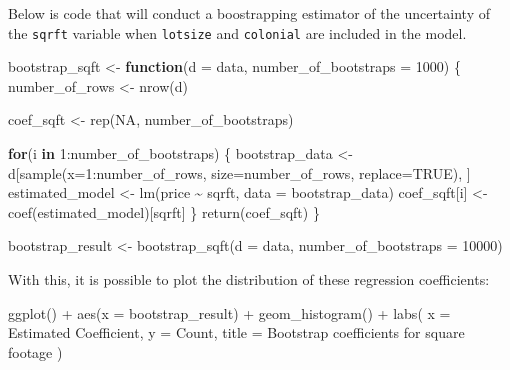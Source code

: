 \documentclass[
]{book}
\newenvironment{Shaded}{\begin{snugshade}}{\end{snugshade}}
\newcommand{\AttributeTok}[1]{\textcolor[rgb]{0.77,0.63,0.00}{#1}}
\newcommand{\ConstantTok}[1]{\textcolor[rgb]{0.00,0.00,0.00}{#1}}
\newcommand{\ControlFlowTok}[1]{\textcolor[rgb]{0.13,0.29,0.53}{\textbf{#1}}}
\newcommand{\DecValTok}[1]{\textcolor[rgb]{0.00,0.00,0.81}{#1}}
\newcommand{\FunctionTok}[1]{\textcolor[rgb]{0.00,0.00,0.00}{#1}}
\newcommand{\NormalTok}[1]{#1}
\newcommand{\OtherTok}[1]{\textcolor[rgb]{0.56,0.35,0.01}{#1}}
\newcommand{\SpecialCharTok}[1]{\textcolor[rgb]{0.00,0.00,0.00}{#1}}
\newcommand{\StringTok}[1]{\textcolor[rgb]{0.31,0.60,0.02}{#1}}
\theoremstyle{definition}
\theoremstyle{definition}
\theoremstyle{definition}
\theoremstyle{definition}
\theoremstyle{remark}
\begin{document}
Below is code that will conduct a boostrapping estimator of the uncertainty of the \texttt{sqrft} variable when \texttt{lotsize} and \texttt{colonial} are included in the model.

\begin{Shaded}
\begin{Highlighting}[]
\NormalTok{bootstrap\_sqft }\OtherTok{\textless{}{-}} \ControlFlowTok{function}\NormalTok{(}\AttributeTok{d =}\NormalTok{ data, }\AttributeTok{number\_of\_bootstraps =} \DecValTok{1000}\NormalTok{) \{ }
\NormalTok{  number\_of\_rows }\OtherTok{\textless{}{-}} \FunctionTok{nrow}\NormalTok{(d)}

\NormalTok{    coef\_sqft }\OtherTok{\textless{}{-}} \FunctionTok{rep}\NormalTok{(}\ConstantTok{NA}\NormalTok{, number\_of\_bootstraps)}

    \ControlFlowTok{for}\NormalTok{(i }\ControlFlowTok{in} \DecValTok{1}\SpecialCharTok{:}\NormalTok{number\_of\_bootstraps) \{ }
\NormalTok{      bootstrap\_data }\OtherTok{\textless{}{-}}\NormalTok{ d[}\FunctionTok{sample}\NormalTok{(}\AttributeTok{x=}\DecValTok{1}\SpecialCharTok{:}\NormalTok{number\_of\_rows, }\AttributeTok{size=}\NormalTok{number\_of\_rows, }\AttributeTok{replace=}\ConstantTok{TRUE}\NormalTok{), ]  }
\NormalTok{      estimated\_model }\OtherTok{\textless{}{-}} \FunctionTok{lm}\NormalTok{(price }\SpecialCharTok{\textasciitilde{}}\NormalTok{ sqrft, }\AttributeTok{data =}\NormalTok{ bootstrap\_data)}
\NormalTok{      coef\_sqft[i]    }\OtherTok{\textless{}{-}} \FunctionTok{coef}\NormalTok{(estimated\_model)[}\StringTok{\textquotesingle{}sqrft\textquotesingle{}}\NormalTok{]}
\NormalTok{    \}}
  \FunctionTok{return}\NormalTok{(coef\_sqft)}
\NormalTok{\}}
\end{Highlighting}
\end{Shaded}

\begin{Shaded}
\begin{Highlighting}[]
\NormalTok{bootstrap\_result }\OtherTok{\textless{}{-}} \FunctionTok{bootstrap\_sqft}\NormalTok{(}\AttributeTok{d =}\NormalTok{ data, }\AttributeTok{number\_of\_bootstraps =} \DecValTok{10000}\NormalTok{)}
\end{Highlighting}
\end{Shaded}

With this, it is possible to plot the distribution of these regression coefficients:

\begin{Shaded}
\begin{Highlighting}[]
\FunctionTok{ggplot}\NormalTok{() }\SpecialCharTok{+} 
  \FunctionTok{aes}\NormalTok{(}\AttributeTok{x =}\NormalTok{ bootstrap\_result) }\SpecialCharTok{+} 
  \FunctionTok{geom\_histogram}\NormalTok{() }\SpecialCharTok{+} 
  \FunctionTok{labs}\NormalTok{(}
    \AttributeTok{x =} \StringTok{\textquotesingle{}Estimated Coefficient\textquotesingle{}}\NormalTok{, }
    \AttributeTok{y =} \StringTok{\textquotesingle{}Count\textquotesingle{}}\NormalTok{, }
    \AttributeTok{title =} \StringTok{\textquotesingle{}Bootstrap coefficients for square footage\textquotesingle{}}
\NormalTok{  )}
\end{Highlighting}
\end{Shaded}
\end{document}
